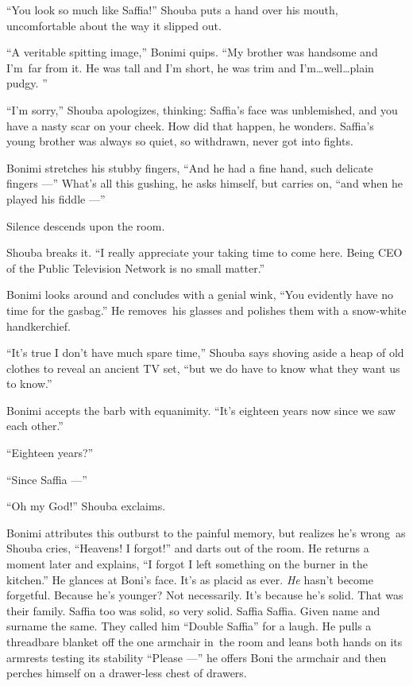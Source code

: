 \documentclass[twoside,11pt,openany]{book}
\begin{document}
``You look so much like Saffia!'' Shouba puts a hand over his mouth, uncomfortable about the
way it slipped out.

``A veritable spitting image,'' Bonimi quips. ``My brother was handsome and
I'm~far from it. He was tall and I'm short, he was trim and I'm{\ldots}well{\ldots}plain pudgy. ''

``I'm sorry,'' Shouba apologizes, thinking: Saffia's face was unblemished,
and{ }you have a nasty scar on your cheek.  How did that happen,
he wonders. Saffia's young brother was always so quiet, so withdrawn, never got into fights.

Bonimi stretches his stubby fingers, ``And he had a fine hand, such delicate fingers ---''
What's all this gushing, he asks himself, but carries on, ``and when he played his fiddle ---''

Silence descends upon the room.

Shouba breaks it. ``I really appreciate your taking time to come here. Being CEO of the Public Television
Network is no small matter.''

Bonimi looks around and concludes with a genial wink, ``You evidently have no time for the
gasbag.'' He removes~his glasses and polishes them with a snow-white handkerchief.

``It's true I don't have much spare time,'' Shouba says shoving aside a heap of old clothes to
reveal an ancient TV set, ``but we do have to know what they want us to know.''

Bonimi accepts the barb with equanimity. ``It's eighteen years now since we saw each other.''

``Eighteen years?''

``Since Saffia ---''

``Oh my God!'' Shouba exclaims.

Bonimi attributes this outburst to the painful memory, but realizes he's wrong~as Shouba cries,
``Heavens!{ }I forgot!''
{ }and darts out of the room. He returns a moment later and explains,
``I forgot I left something on the burner in the kitchen.'' He glances at Boni's face. It's
as placid as ever. \textit{He} hasn't become forgetful. Because he's younger? Not necessarily. It's because he's solid.
That was their family. Saffia too was solid, so very solid. Saffia Saffia. Given name and surname the same. They called
him ``Double Saffia'' for a laugh. He pulls a threadbare blanket off the one armchair in~the
room and leans both hands on its armrests testing its stability ``Please ---'' he offers Boni
the armchair and then perches himself on a drawer-less chest of drawers.
\end{document}
